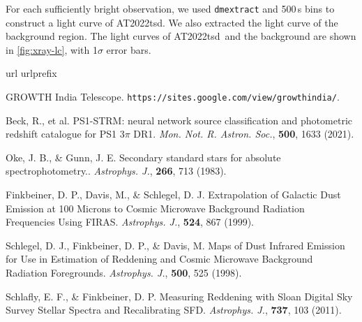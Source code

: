 \documentclass{nature_plusfigure}
\newcommand{\mn}{{Mon. Not. R. Astron. Soc.}}
\newcommand{\mnras}{\mn}
\newcommand{\apj}{{Astrophys. J.}}
\newcommand{\at}{AT2022tsd}
\begin{document}
\begin{methods}
For each sufficiently bright observation, we used \texttt{dmextract} and 500\,s bins to construct a light curve of \at. We also extracted the light curve of the background region. The light curves of \at\ and the background are shown in \ref{fig:xray-lc}, with 1$\sigma$ error bars.

\vspace{1in}
%
%

\begin{thebibliography}{10}
\expandafter\ifx\csname url\endcsname\relax
  \def\url#1{\texttt{#1}}\fi
\expandafter\ifx\csname urlprefix\endcsname\relax\def\urlprefix{URL }\fi
\providecommand{\bibinfo}[2]{#2}
\providecommand{\eprint}[2][]{\url{#2}}
\makeatletter
\addtocounter{\@listctr}{44}
\makeatother


\bibinfo{title}{{GROWTH India Telescope}}.
\newblock
  \bibinfo{howpublished}{\url{https://sites.google.com/view/growthindia/}}.


 Beck, R., et al. PS1-STRM: neural network source classification and photometric redshift catalogue for PS1 3$\pi$ DR1. \emph{\mnras}, \textbf{500}, 1633 (2021). 

 Oke, J. B., \& Gunn, J. E. Secondary standard stars for absolute spectrophotometry.. \emph{\apj}, \textbf{266}, 713 (1983). 

 Finkbeiner, D. P., Davis, M., \& Schlegel, D. J. Extrapolation of Galactic Dust Emission at 100 Microns to Cosmic Microwave Background Radiation Frequencies Using FIRAS. \emph{\apj}, \textbf{524}, 867 (1999). 
 
 Schlegel, D. J., Finkbeiner, D. P., \& Davis, M. Maps of Dust Infrared Emission for Use in Estimation of Reddening and Cosmic Microwave Background Radiation Foregrounds. \emph{\apj}, \textbf{500}, 525 (1998). 

 Schlafly, E. F., \& Finkbeiner, D. P. Measuring Reddening with Sloan Digital Sky Survey Stellar Spectra and Recalibrating SFD. \emph{\apj}, \textbf{737}, 103 (2011). 
 


\end{thebibliography}
\end{methods}
\end{document}
